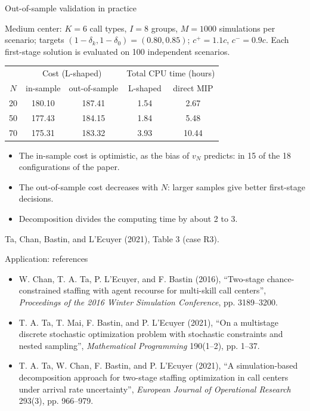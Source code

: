 \documentclass[aspectratio=169]{beamer}
\begin{document}
\begin{frame}{Out-of-sample validation in practice}
	
	Medium center: $K = 6$ call types, $I = 8$ groups, $M = 1000$ simulations per scenario; targets $(1-\delta_k, 1-\delta_0) = (0.80, 0.85)$; $c^+ = 1.1c$, $c^- = 0.9c$. Each first-stage solution is evaluated on 100 independent scenarios.
	
	\begin{center}
		\begin{tabular}{c|cc|cc}
			& \multicolumn{2}{c|}{Cost (L-shaped)} & \multicolumn{2}{c}{Total CPU time (hours)} \\
			$N$ & in-sample & out-of-sample & L-shaped & direct MIP \\
			\hline
			20 & 180.10 & 187.41 & 1.54 & 2.67 \\
			50 & 177.43 & 184.15 & 1.84 & 5.48 \\
			70 & 175.31 & 183.32 & 3.93 & 10.44
		\end{tabular}
	\end{center}
	
	\begin{itemize}
		\item
		The in-sample cost is {\red optimistic}, as the bias of $v_N$ predicts: in 15 of the 18 configurations of the paper.
		\item
		The out-of-sample cost decreases with $N$: larger samples give better first-stage decisions.
		\item
		Decomposition divides the computing time by about 2 to 3.
	\end{itemize}
	
	{\footnotesize Ta, Chan, Bastin, and L'Ecuyer (2021), Table 3 (case R3).}
	
\end{frame}

\begin{frame}{Application: references}
	
	\begin{itemize}
		\item
		W. Chan, T. A. Ta, P. L'Ecuyer, and F. Bastin (2016), ``Two-stage chance-constrained staffing with agent recourse for multi-skill call centers'', {\sl Proceedings of the 2016 Winter Simulation Conference}, pp. 3189--3200.
		\item
		T. A. Ta, T. Mai, F. Bastin, and P. L'Ecuyer (2021), ``On a multistage discrete stochastic optimization problem with stochastic constraints and nested sampling'', {\sl Mathematical Programming} 190(1--2), pp. 1--37.
		\item
		T. A. Ta, W. Chan, F. Bastin, and P. L'Ecuyer (2021), ``A simulation-based decomposition approach for two-stage staffing optimization in call centers under arrival rate uncertainty'', {\sl European Journal of Operational Research} 293(3), pp. 966--979.
	\end{itemize}
	
\end{frame}
\end{document}
